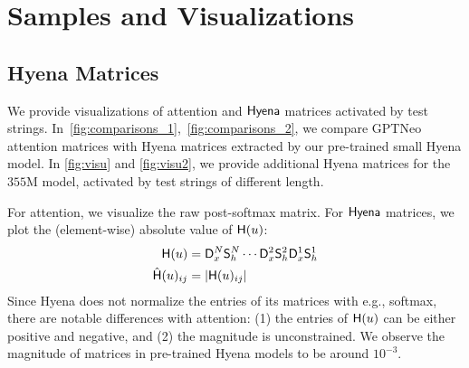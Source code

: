 \section{Samples and Visualizations}
%

\subsection{Hyena Matrices}
We provide visualizations of attention and ${\sf Hyena}$ matrices activated by test strings. In~\ref{fig:comparisons_1},~\ref{fig:comparisons_2}, we compare GPTNeo \citep{gpt-neo} attention matrices with Hyena matrices extracted by our pre-trained small {\sf Hyena} model. In \ref{fig:visu} and \ref{fig:visu2}, we provide additional Hyena matrices for the $355$M model, activated by test strings of different length.

For attention, we visualize the raw post-softmax matrix. For ${\sf Hyena}$ matrices, we plot the (element-wise) absolute value of $\mathsf{H}(u)$:
%
\[ 
\begin{aligned}
\mathsf{H}(u) &= \mathsf{D}_x^N\mathsf{S}_h^N \cdots \mathsf{D}_x^2\mathsf{S}_h^2\mathsf{D}_{x}^1\mathsf{S}_h^1 \\ 
\hat {\mathsf{H}}(u)_{ij} &= \left|\mathsf{H}(u)_{ij}\right|
\end{aligned}
\]
%
Since {\sf Hyena} does not normalize the entries of its matrices with e.g., softmax, there are notable differences with attention: (1) the entries of $\mathsf{H}(u)$ can be either positive and negative, and (2) the magnitude is unconstrained. We observe the magnitude of matrices in pre-trained {\sf Hyena} models to be around $10^{-3}$.

%


